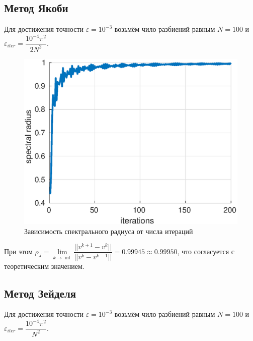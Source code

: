 \documentclass[12pt]{article}
\begin{document}
\subsection{Метод Якоби}

Для достижения точности $\varepsilon = 10^{-3}$ возьмём чило разбиений равным $N = 100$ и $\varepsilon_{iter} = \dfrac{10^{-4}\pi^2}{2N^2}$. 

\begin{figure}[H]
\centerline{\includegraphics[scale = 0.8]{jacobiSpectre.eps}}
\caption{Зависимость спектрального радиуса от числа итераций}
\label{fig4}
\end{figure} 

При этом $\rho_{J} = \lim\limits_{k\rightarrow \inf}{\dfrac{||v^{k+1} - v^{k}||}{||v^{k} - v^{k-1}||}} = 0.99945 \approx 0.99950 $, что согласуется с теоретическим значением.
 
\subsection{Метод Зейделя}

Для достижения точности $\varepsilon = 10^{-3}$ возьмём чило разбиений равным $N = 100$ и $\varepsilon_{iter} = \dfrac{10^{-4}\pi^2}{N^2}$. 
\end{document}
